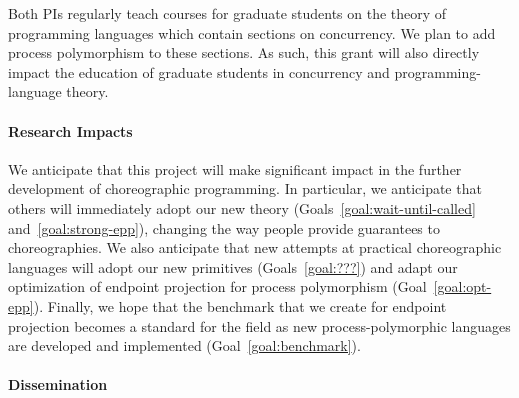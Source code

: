 Both PIs regularly teach courses for graduate students on the theory of programming languages which contain sections on concurrency.
We plan to add process polymorphism to these sections.
As such, this grant will also directly impact the education of graduate students in concurrency and programming-language theory.

\paragraph{Research Impacts}
We anticipate that this project will make significant impact in the further development of choreographic programming.
In particular, we anticipate that others will immediately adopt our new theory (Goals~\ref{goal:wait-until-called} and~\ref{goal:strong-epp}), changing the way people provide guarantees to choreographies.
We also anticipate that new attempts at practical choreographic languages will adopt our new primitives (Goals~\ref{goal:???}) and adapt our optimization of endpoint projection for process polymorphism (Goal~\ref{goal:opt-epp}).
Finally, we hope that the benchmark that we create for endpoint projection becomes a standard for the field as new process-polymorphic languages are developed and implemented (Goal~\ref{goal:benchmark}).

\paragraph{Dissemination}

